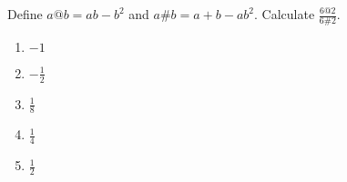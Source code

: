 Define $a@b=ab-b^{2}$ and $a\#b=a+b-ab^{2}$. Calculate $\displaystyle\frac{6@2}{6\#2}$.

\begin{enumerate}
\item $-1$
\item $-\displaystyle\frac{1}{2}$
\item $\displaystyle\frac{1}{8}$
\item $\displaystyle\frac{1}{4}$
\item $\displaystyle\frac{1}{2}$
\end{enumerate}
